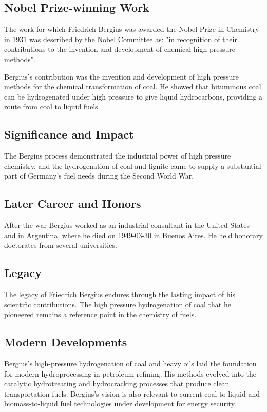\subsection*{Nobel Prize-winning Work}

The work for which Friedrich Bergius was awarded the Nobel Prize in Chemistry in 1931 was described by the Nobel Committee as: "in recognition of their contributions to the invention and development of chemical high pressure methods".

Bergius's contribution was the invention and development of high pressure methods for the chemical transformation of coal.
He showed that bituminous coal can be hydrogenated under high pressure to give liquid hydrocarbons, providing a route from coal to liquid fuels.

\subsection*{Significance and Impact}

The Bergius process demonstrated the industrial power of high pressure chemistry, and the hydrogenation of coal and lignite came to supply a substantial part of Germany's fuel needs during the Second World War.

\subsection*{Later Career and Honors}

After the war Bergius worked as an industrial consultant in the United States and in Argentina, where he died on 1949-03-30 in Buenos Aires.
He held honorary doctorates from several universities.

\subsection*{Legacy}

The legacy of Friedrich Bergius endures through the lasting impact of his scientific contributions.
The high pressure hydrogenation of coal that he pioneered remains a reference point in the chemistry of fuels.

\subsection*{Modern Developments}

Bergius's high-pressure hydrogenation of coal and heavy oils laid the foundation for modern hydroprocessing in petroleum refining. His methods evolved into the catalytic hydrotreating and hydrocracking processes that produce clean transportation fuels. Bergius's vision is also relevant to current coal-to-liquid and biomass-to-liquid fuel technologies under development for energy security.

